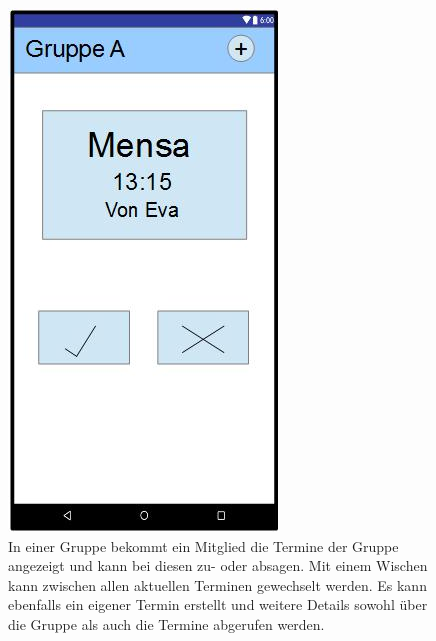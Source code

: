 \documentclass{scrartcl}
\begin{document}
	\newpage
	\begin{figure}[h]
		\centering
		\includegraphics[width=.5\textwidth]{GUI_Gruppe.jpg}
		\caption{In einer Gruppe bekommt ein  \gls{Mitglied} die Termine der Gruppe angezeigt und kann bei diesen zu- oder absagen. Mit einem Wischen kann zwischen allen aktuellen Terminen gewechselt werden. Es kann ebenfalls ein eigener Termin erstellt und weitere Details sowohl über die Gruppe als auch die Termine abgerufen werden.}
	\end{figure}
	
\end{document}
